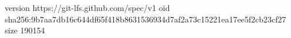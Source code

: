 version https://git-lfs.github.com/spec/v1
oid sha256:9b7aa7db16c644df65f418b8631536934d7af2a73c15221ea17ee5f2cb23cf27
size 190154
